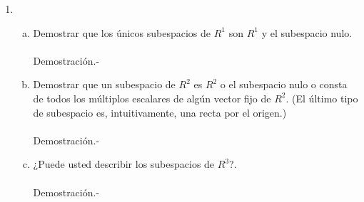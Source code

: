 \begin{enumerate}[\bfseries 1.]
\begin{enumerate}[(a)]
	\end{enumerate}

    \item 
	\begin{enumerate}[(a)]

	    \item Demostrar que los únicos subespacios de $R^1$ son $R^1$ y el subespacio nulo.\\\\
		Demostración.-\; 

	    \item Demostrar que un subespacio de $R^2$ es $R^2$ o el subespacio nulo o consta de todos los múltiplos escalares de algún vector fijo de $R^2$. (El último tipo de subespacio es, intuitivamente, una recta por el origen.)\\\\
		Demostración.-\;

	    \item ¿Puede usted describir los subespacios de $R^3$?.\\\\
		Demostración.-\; 

	\end{enumerate}

\end{enumerate}

